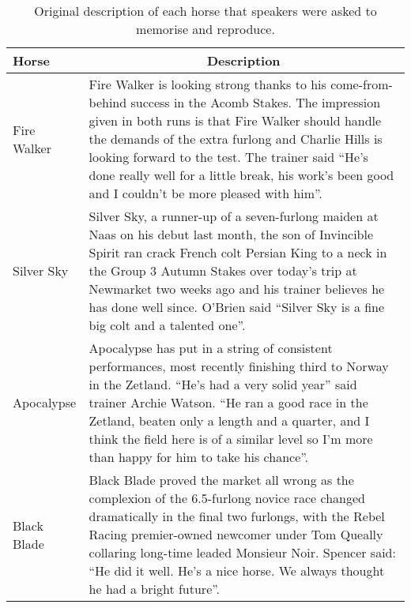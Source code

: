 \documentclass[
  man,floatsintext]{apa7}
\begin{document}
\begin{table}[tbp]

\begin{center}
\begin{threeparttable}

\caption{\label{tab:tab-horse-description-text}Original description of each horse that speakers were asked to memorise and reproduce.}

\begin{tabular}{m{2cm}m{13cm}}
\toprule
Horse & \multicolumn{1}{c}{Description}\\
\midrule
Fire Walker & Fire Walker is looking strong thanks to his come-from-behind success in the Acomb Stakes. The impression given in both runs is that Fire Walker should handle the demands of the extra furlong and Charlie Hills is looking forward to the test. The trainer said ``He's done really well for a little break, his work's been good and I couldn't be more pleased with him''.\\
Silver Sky & Silver Sky, a runner-up of a seven-furlong maiden at Naas on his debut last month, the son of Invincible Spirit ran crack French colt Persian King to a neck in the Group 3 Autumn Stakes over today's trip at Newmarket two weeks ago and his trainer believes he has done well since. O'Brien said ``Silver Sky is a fine big colt and a talented one''.\\
Apocalypse & Apocalypse has put in a string of consistent performances, most recently finishing third to Norway in the Zetland. ``He's had a very solid year'' said trainer Archie Watson. ``He ran a good race in the Zetland, beaten only a length and a quarter, and I think the field here is of a similar level so I'm more than happy for him to take his chance''.\\
Black Blade & Black Blade proved the market all wrong as the complexion of the 6.5-furlong novice race changed dramatically in the final two furlongs, with the Rebel Racing premier-owned newcomer under Tom Queally collaring long-time leaded Monsieur Noir. Spencer said: ``He did it well. He's a nice horse. We always thought he had a bright future''.\\
\bottomrule
\end{tabular}

\end{threeparttable}
\end{center}

\end{table}
\end{document}
